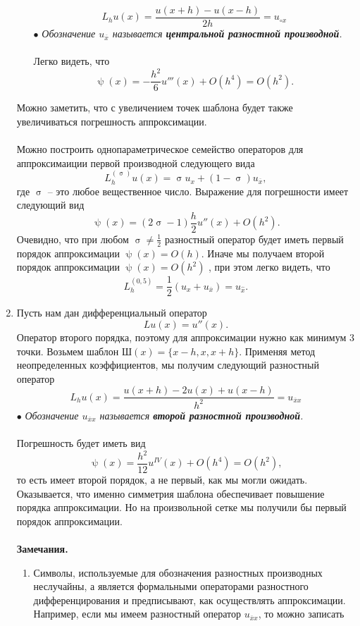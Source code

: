 \documentclass[a4paper, 12pt]{report}
\numberwithin{equation}{section}
\newcommand{\ol}{\overline}
\renewcommand{\sigma}{\upsigma}
\renewcommand{\psi}{\uppsi}
\begin{document}
\begin{enumerate}
\begin{enumerate}
			\begin{equation}
				L_hu(x) = \dfrac{u(x+h) - u(x-h)}{2h} = u_{\circ x}
			\end{equation}
			$\bullet$ \textit{Обозначение $u_{\ol x}$ называется \textbf{центральной разностной производной}.}
			\\\\
			Легко видеть, что $$\psi(x) = -\dfrac {h^2}{6} u'''(x) + O(h^4) = O(h^2).$$ 
		\end{enumerate}
		Можно заметить, что с увеличением точек шаблона будет также увеличиваться погрешность аппроксимации.\\\\
		Можно построить однопараметрическое семейство операторов для аппроксимаиции первой производной следующего вида $$L_h^{(\sigma)}u(x) = \sigma u_x + (1-\sigma)u_{\ol x},$$
		где $\sigma$ -- это любое вещественное число. Выражение для погрешности имеет следующий вид
		$$\psi(x) = (2\sigma - 1)\dfrac h2 u''(x) + O(h^2).$$
		Очевидно, что при любом $\sigma \ne \frac 12$ разностный оператор будет иметь первый порядок аппроксимации $\psi(x) = O(h).$ Иначе мы получаем второй порядок аппроксимации $\psi(x) = O(h^2)$ , при этом легко видеть, что $$L_h^{(0,5)} = \dfrac 12(u_x + u_{\ol x}) = u_{\hat x}.$$
		\item Пусть нам дан дифференциальный оператор $$Lu(x) = u''(x).$$ Оператор второго порядка, поэтому для аппроксимации нужно как минимум 3 точки. Возьмем шаблон $\text{Ш}(x) = \{x-h, x, x+h\}$. Применяя метод неопределенных коэффициентов, мы получим следующий разностный оператор \begin{equation}
		L_h u(x) = \dfrac{u(x+h) - 2u(x) + u(x-h)}{h^2}=u_{\ol xx}
		\end{equation}
		$\bullet$ \textit{Обозначение $u_{\ol x x}$ называется \textbf{второй разностной производной}.}\\\\
		Погрешность будет иметь вид $$\psi(x) = \dfrac {h^2}{12} u^{IV}(x) + O(h^4) = O(h^2),$$ то есть имеет второй порядок, а не первый, как мы могли ожидать. Оказывается, что именно симметрия шаблона обеспечивает повышение порядка аппроксимации. Но на произвольной сетке мы получили бы первый порядок аппроксимации.\\\\
		\textbf{Замечания.}
		\begin{enumerate}
			\item Символы, используемые для обозначения разностных производных неслучайны, а является формальными операторами разностного дифференцирования и предписывают, как осуществлять аппроксимации. Например, если мы имеем разностный оператор $u_{\ol x x}$, то можно записать

\end{enumerate}
\end{enumerate}
\end{document}
